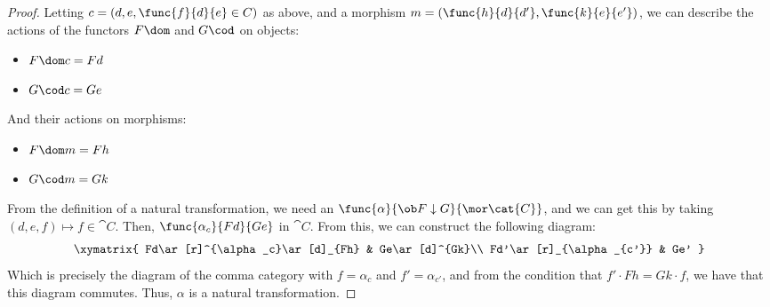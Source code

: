 \documentclass[main.tex]{subfiles}
\begin{document}
\begin{proof}	
	Letting $c=(d,e,\func{f}{d}{e}\in C)$ as above, and a morphism
	$m=(\func{h}{d}{d'},\func{k}{e}{e'})$, we can describe the actions of the
	functors $F\dom$ and $G\cod$ on objects:
	\begin{itemize}
		\item $F\dom c = Fd$
		\item $G\cod c = Ge$
	\end{itemize}
	And their actions on morphisms:
	\begin{itemize}
		\item $F\dom m = Fh$
		\item $G\cod m = Gk$
	\end{itemize}
	From the definition of a natural transformation, we need an
	$\func{\alpha}{\ob F\downarrow G}{\mor\cat{C}}$, and we can get this by
	taking $(d,e,f)\mapsto f\in \cat{C}$. Then, $\func{\alpha_c}{Fd}{Ge}$ in
	$\cat{C}$. From this, we can construct the following diagram:
	\[\xymatrix{
		Fd\ar[r]^{\alpha_c}\ar[d]_{Fh} & Ge\ar[d]^{Gk}\\
		Fd'\ar[r]_{\alpha_{c'}} & Ge'
	}\]
	Which is precisely the diagram of the comma category with $f=\alpha_c$ and
	$f'=\alpha_{c'}$, and from the condition that $f'\cdot Fh = Gk\cdot f$, we
	have that this diagram commutes. Thus, $\alpha$ is a natural
	transformation.
\end{proof}
\end{document}
